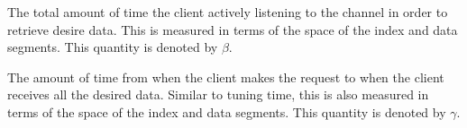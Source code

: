 \begin{definition}\label{def:tuning_time}
The total amount of time the client actively listening to the
channel in order to retrieve desire data. This is measured in
terms of the space of the index and data segments. This quantity
is denoted by $\beta$.
\end{definition}

\begin{definition}\label{def:access_latency}
The amount of time from when the client makes the request to when
the client receives all the desired data. Similar to tuning time,
this is also measured in terms of the space of the index and data
segments. This quantity is denoted by $\gamma$.
\end{definition}

